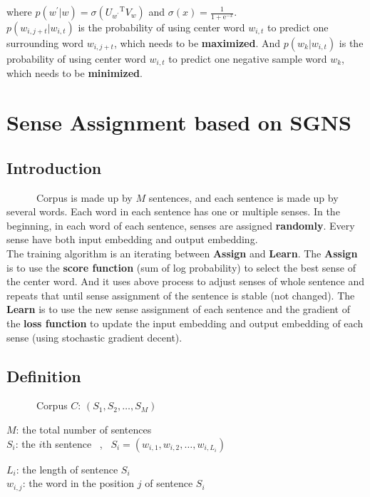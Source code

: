 \documentclass[12pt,a4paper,twoside]{book}
\begin{document}
where $p(w^\prime|w) = \sigma({U_{w^\prime}}^{\mathrm{T}}V_w)$
 and $\sigma(x) = \frac{1}{1+\mathrm{e}^{-x}}$. \\
 
 $p(w_{i,j+t}|w_{i,t})$ is the probability of using center word $w_{i,t}$ to predict one surrounding word $w_{i,j+t}$, which needs to be \textbf{maximized}.
And $p(w_k|w_{i,t})$ is the probability of using center word $w_{i,t}$ to predict one negative sample word $w_k$, which needs to be \textbf{minimized}.  \\

\section{Sense Assignment based on SGNS}
\subsection{Introduction}
\ \ \ \ \ \ Corpus is made up by $M$ sentences, and each sentence is made up by several words. Each word in each sentence has one or multiple senses. In the beginning, in each word of each sentence, senses are assigned \textbf{randomly}. Every sense have both input embedding and output embedding.\\

The training algorithm is an iterating between \textbf{Assign} and \textbf{Learn}. The \textbf{Assign} is to use the \textbf{score function} (sum of log probability) to select the best sense of the center word. And it uses above process to adjust senses of whole sentence and repeats that until sense assignment of the sentence is stable (not changed). The \textbf{Learn} is to use the new sense assignment of each sentence and the gradient of the \textbf{loss function} to update the input embedding and output embedding of each sense (using stochastic gradient decent). 
\subsection{Definition}

\ \ \ \ \ \ Corpus $C$: $(S_1,S_2,\ldots,S_M)$

$M$: the total number of sentences\\

$S_i$: the $i$th sentence \ , \ $S_i = (w_{i,1},w_{i,2},\ldots,w_{i,L_i})$

$L_i$: the length of sentence $S_i$\\

$w_{i,j}$: the word in the position $j$ of sentence $S_i$\\
\end{document}
